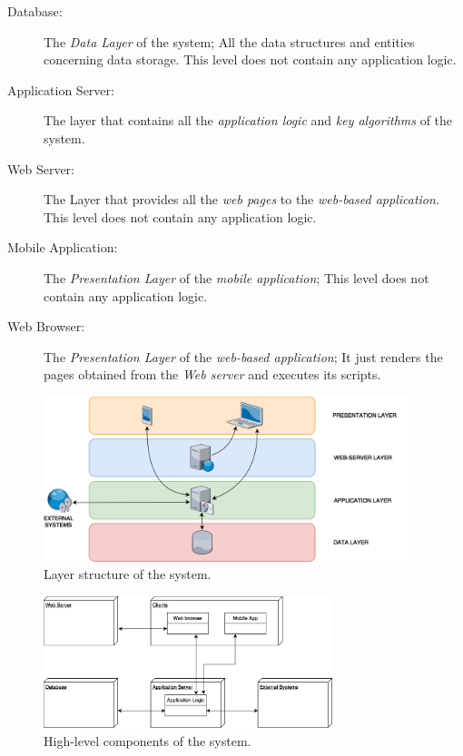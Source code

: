 \documentclass{article}
\begin{document}
	\begin{description}
	\item [Database:] The \textit{Data Layer} of the system; All the data structures and entities concerning data storage. This level does not contain any application logic.
	\item [Application Server:] The layer that contains all the \textit{application logic} and \textit{key algorithms} of the system.
	\item [Web Server:] The Layer that provides all the \textit{web pages} to the \textit{web-based application}. This level does not contain any application logic.
	\item [Mobile Application:] The \textit{Presentation Layer} of the \textit{mobile application}; This level does not contain any application logic.
	\item [Web Browser:] The \textit{Presentation Layer} of the \textit{web-based application}; It just renders the pages obtained from the \textit{Web server} and executes its scripts.
	\end{description}

	\begin{figure}[ht]
	\centering
	\includegraphics[width=0.95\textwidth]{img/diagrams/layers.png}
	\caption{Layer structure of the system.}
	\end{figure}

	\begin{figure}[ht]
	\centering
	\includegraphics[width=0.75\textwidth]{img/diagrams/hlc.png}
	\caption{High-level components of the system.}
	\end{figure}
\end{document}
